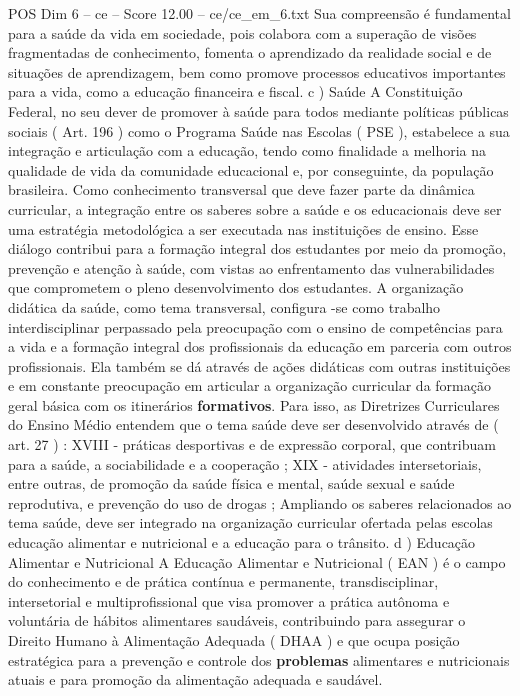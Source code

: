 \begin{textsample}{POS Dim 6 – ce – Score 12.00 – ce/ce\_em\_6.txt}
Sua compreensão é fundamental para a saúde da vida em sociedade, pois colabora com a superação de visões fragmentadas de conhecimento, fomenta o aprendizado da realidade social e de situações de aprendizagem, bem como promove processos educativos importantes para a vida, como a educação financeira e fiscal. c ) Saúde A Constituição Federal, no seu dever de promover à saúde para todos mediante políticas públicas sociais ( Art. 196 ) como o Programa Saúde nas Escolas ( PSE ), estabelece a sua integração e articulação com a educação, tendo como finalidade a melhoria na qualidade de vida da comunidade educacional e, por conseguinte, da população brasileira.
Como conhecimento transversal que deve fazer parte da dinâmica curricular, a integração entre os saberes sobre a saúde e os educacionais deve ser uma estratégia metodológica a ser executada nas instituições de ensino.
Esse diálogo contribui para a formação integral dos estudantes por meio da promoção, prevenção e atenção à saúde, com vistas ao enfrentamento das vulnerabilidades que comprometem o pleno desenvolvimento dos estudantes.
A organização didática da saúde, como tema transversal, configura -se como trabalho interdisciplinar perpassado pela preocupação com o ensino de competências para a vida e a formação integral dos profissionais da educação em parceria com outros profissionais.
Ela também se dá através de ações didáticas com outras instituições e em constante preocupação em articular a organização curricular da formação geral básica com os itinerários \textbf{formativos}.
Para isso, as Diretrizes Curriculares do Ensino Médio entendem que o tema saúde deve ser desenvolvido através de ( art. 27 ) : XVIII - práticas desportivas e de expressão corporal, que contribuam para a saúde, a sociabilidade e a cooperação ; XIX - atividades intersetoriais, entre outras, de promoção da saúde física e mental, saúde sexual e saúde reprodutiva, e prevenção do uso de drogas ; Ampliando os saberes relacionados ao tema saúde, deve ser integrado na organização curricular ofertada pelas escolas educação alimentar e nutricional e a educação para o trânsito. d ) Educação Alimentar e Nutricional A Educação Alimentar e Nutricional ( EAN ) é o campo do conhecimento e de prática contínua e permanente, transdisciplinar, intersetorial e multiprofissional que visa promover a prática autônoma e voluntária de hábitos alimentares saudáveis, contribuindo para assegurar o Direito Humano à Alimentação Adequada ( DHAA ) e que ocupa posição estratégica para a prevenção e controle dos \textbf{problemas} alimentares e nutricionais atuais e para promoção da alimentação adequada e saudável.

\end{textsample}

